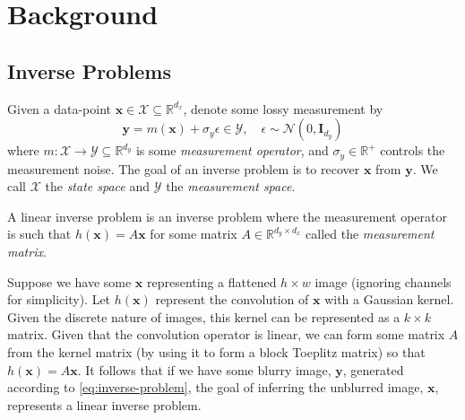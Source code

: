 \chapter{Background} \label{chap:background}

\section{Inverse Problems}\label{sec:inverse-problems}

\begin{definition}\label{def:inverse-problem}
    Given  a data-point $\mathbf{x} \in \mathcal{X} \subseteq \mathbb{R}^{d_x}$,
    denote some lossy measurement by
    \begin{equation}
        \mathbf{y} = m(\mathbf{x}) + \sigma_y\epsilon \in \mathcal{Y},\quad \epsilon \sim \mathcal{N}\left(0, \mathbf{I}_{d_y}\right) \label{eq:inverse-problem}
    \end{equation}
    where $m: \mathcal{X} \to \mathcal{Y} \subseteq \mathbb{R}^{d_y}$ is some \emph{measurement operator},
    and $\sigma_y \in \mathbb{R}^+$ controls the measurement noise. The goal of an inverse problem
    is to recover $\mathbf{x}$ from $\mathbf{y}$. We call $\mathcal{X}$ the \emph{state space} and
    $\mathcal{Y}$ the \emph{measurement space}.
\end{definition}

\begin{definition}\label{def:linear-inverse-problem}
    A linear inverse problem is an inverse problem where the measurement operator is such that
    $h(\mathbf{x}) = A\mathbf{x}$ for some matrix $A \in \mathbb{R}^{d_y \times d_x}$ called the
    \emph{measurement matrix}.
\end{definition}

\begin{example}
    Suppose we have some $\mathbf{x}$ representing a flattened $h\times w$ image (ignoring channels
    for simplicity). Let $h(\mathbf{x})$ represent the convolution of $\mathbf{x}$ with a Gaussian
    kernel. Given the discrete nature of images, this kernel can be represented as a
    $k \times k$ matrix. Given that the convolution operator is linear, we can form some matrix $A$
    from the kernel matrix (by using it to form a block Toeplitz matrix) so that
    $h(\mathbf{x}) = A\mathbf{x}$. It follows that if we have some blurry image, $\mathbf{y}$,
    generated according to \autoref{eq:inverse-problem}, the goal of inferring the unblurred image,
    $\mathbf{x}$, represents a linear inverse problem.
\end{example}

